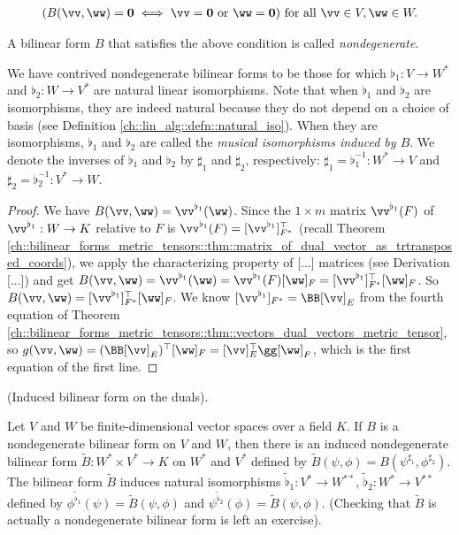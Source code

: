 \begin{defn}
    \begin{align*}
        (B(\vv, \ww) = \mathbf{0} \iff \vv = \mathbf{0} \text{ or } \ww = \mathbf{0}) \text{ for all } \vv \in V, \ww \in W.
    \end{align*}
    
    A bilinear form $B$ that satisfies the above condition is called \textit{nondegenerate}. 
    
    We have contrived nondegenerate bilinear forms to be those for which $\flat_1:V \rightarrow W^{*}$ and $\flat_2:W \rightarrow V^{*}$ are natural linear isomorphisms. Note that when $\flat_1$ and $\flat_2$ are isomorphisms, they are indeed natural because they do not depend on a choice of basis (see Definition \ref{ch::lin_alg::defn::natural_iso}). When they are isomorphisms, $\flat_1$ and $\flat_2$ are called the \textit{musical isomorphisms induced by $B$}. We denote the inverses of $\flat_1$ and $\flat_2$ by $\sharp_1$ and $\sharp_2$, respectively: $\sharp_1 = \flat_1^{-1}:W^* \rightarrow V$ and $\sharp_2 = \flat_2^{-1}:V^* \rightarrow W$.
\end{defn}

\begin{proof}
    We have $B(\vv, \ww) = \vv^{\flat_1}(\ww)$. Since the $1 \times m$ matrix $\vv^{\flat_1}(F)$ of $\vv^{\flat_1}:W \rightarrow K$ relative to $F$ is $\vv^{\flat_1}(F) = [\vv^{\flat_1}]_{F^*}^\top$ (recall Theorem \ref{ch::bilinear_forms_metric_tensors::thm::matrix_of_dual_vector_as_trtransposed_coords}), we apply the characterizing property of [...] matrices (see Derivation [...]) and get $B(\vv, \ww) = \vv^{\flat_1}(\ww) = \vv^{\flat_1}(F) [\ww]_F = [\vv^{\flat_1}]_{F^*}^\top [\ww]_F$. So $B(\vv, \ww) = [\vv^{\flat_1}]_{F^*}^\top [\ww]_F$. We know $[\vv^{\flat_1}]_{F^*} = \BB [\vv]_E$ from the fourth equation of Theorem \ref{ch::bilinear_forms_metric_tensors::thm::vectors_dual_vectors_metric_tensor}, so $g(\vv, \ww) = (\BB [\vv]_E)^\top [\ww]_F = [\vv]_E^\top \gg [\ww]_F$, which is the first equation of the first line.
\end{proof}

\begin{theorem}
\label{ch::bilinear_forms_metric_tensors::induced_bilinear_form_on_duals}
    (Induced bilinear form on the duals).
    
    Let $V$ and $W$ be finite-dimensional vector spaces over a field $K$. If $B$ is a nondegenerate bilinear form on $V$ and $W$, then there is an induced nondegenerate bilinear form $\widetilde{B}:W^* \times V^* \rightarrow K$ on $W^*$ and $V^*$ defined by $\widetilde{B}(\psi, \phi) = B(\psi^{\sharp_1}, \phi^{\sharp_2})$. The bilinear form $\widetilde{B}$ induces natural isomorphisms $\widetilde{\flat}_1:V^* \rightarrow W^{**}$, $\widetilde{\flat}_2:W^* \rightarrow V^{**}$ defined by $\phi^{\widetilde{\flat}_1}(\psi) = \widetilde{B}(\psi, \phi)$ and $\psi^{\widetilde{\flat}_2}(\phi) = \widetilde{B}(\psi, \phi)$. (Checking that $\widetilde{B}$ is actually a nondegenerate bilinear form is left an exercise).
\end{theorem}

